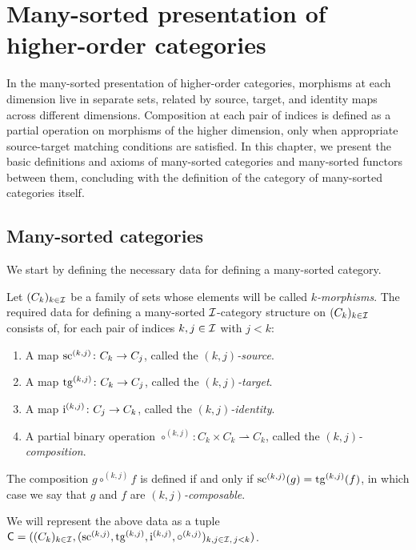 \chapter[Many-sorted presentation]{Many-sorted presentation of higher-order categories}
\label{ch:many_sorted}

In the many-sorted presentation of higher-order categories, morphisms at each dimension live in
separate sets, related by source, target, and identity maps across different dimensions. Composition
at each pair of indices is defined as a partial operation on morphisms of the higher dimension, only
when appropriate source-target matching conditions are satisfied. In this chapter, we present the
basic definitions and axioms of many-sorted categories and many-sorted functors between them,
concluding with the definition of the category of many-sorted categories itself.

\section{Many-sorted categories}

We start by defining the necessary data for defining a many-sorted category.

\begin{definition}
  \label{def:ManySortedCategoryStruct}
  \leanok
  Let $(C_k)_{k \in \mathcal{I}}$ be a family of sets whose elements will be called \emph{$k$-morphisms}.
  The required data for defining a many-sorted $\mathcal{I}$-category structure on $(C_k)_{k \in \mathcal{I}}$
  consists of, for each pair of indices $k, j \in \mathcal{I}$ with $j < k$:

  \begin{enumerate}
    \item \label{ax:ms_sc} A map $\operatorname{sc}^{(k,j)} \colon C_k \to C_j$, called the \emph{$(k,j)$-source}.
    \item \label{ax:ms_tg} A map $\operatorname{tg}^{(k,j)} \colon C_k \to C_j$, called the \emph{$(k,j)$-target}.
    \item \label{ax:ms_idm} A map $\operatorname{i}^{(k,j)} \colon C_j \to C_k$, called the
      \emph{$(k,j)$-identity}.
    \item \label{ax:ms_comp} A partial binary operation $\circ^{(k,j)} \colon C_k \times C_k
      \rightharpoonup C_k$, called the \emph{$(k,j)$-composition}.
  \end{enumerate}

  The composition $g \circ^{(k,j)} f$ is defined if and only if $\operatorname{sc}^{(k,j)} (g) = \operatorname{tg}^{(k,j)} (f)$,
  in which case we say that $g$ and $f$ are \emph{$(k,j)$-composable}.

  We will represent the above data as a tuple $\mathsf{C} = ((C_k)_{k \in \mathcal{I}}, (\operatorname{sc}^{(k,j)},
  \operatorname{tg}^{(k,j)}, \operatorname{i}^{(k,j)}, \circ^{(k,j)})_{k, j \in \mathcal{I}, \, j < k})$.
\end{definition}

